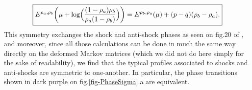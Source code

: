 \documentclass[aps,pre,onecolumn,showpacs,showkeys,a4paper]{revtex4-1}
\begin{document}
\begin{equation}
\boxed{
E^{\rho_a,\rho_b}\biggl(\mu+\log\Bigl(\frac{(1-\rho_a)\rho_b}{\rho_a(1-\rho_b)}\Bigr)\biggr)=E^{\rho_b,\rho_a}(\mu)+(p-q)(\rho_b-\rho_a).
}
\end{equation}
This symmetry exchanges the shock and anti-shock phases as seen on fig.20 of \cite{Lazarescu2015}, and moreover, since all those calculations can be done in much the same way directly on the deformed Markov matrices (which we did not do here simply for the sake of readability), we find that the typical profiles associated to shocks and anti-shocks are symmetric to one-another. In particular, the phase transitions shown in dark purple on fig.\ref{fig-PhaseSigma}.a are equivalent.





\newpage



{}
\end{document}
